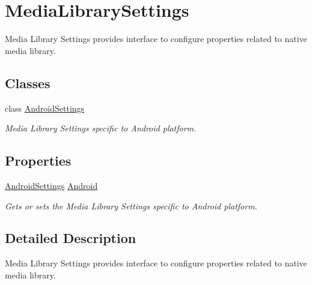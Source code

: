 \hypertarget{class_voxel_busters_1_1_native_plugins_1_1_media_library_settings}{}\section{Media\+Library\+Settings}
\label{class_voxel_busters_1_1_native_plugins_1_1_media_library_settings}


Media Library Settings provides interface to configure properties related to native media library.  


\subsection*{Classes}
\begin{DoxyCompactItemize}
\item 
class \hyperlink{class_voxel_busters_1_1_native_plugins_1_1_media_library_settings_1_1_android_settings}{Android\+Settings}
\begin{DoxyCompactList}\small\item\em Media Library Settings specific to Android platform. \end{DoxyCompactList}\end{DoxyCompactItemize}
\subsection*{Properties}
\begin{DoxyCompactItemize}
\item 
\hyperlink{class_voxel_busters_1_1_native_plugins_1_1_media_library_settings_1_1_android_settings}{Android\+Settings} \hyperlink{class_voxel_busters_1_1_native_plugins_1_1_media_library_settings_a1c2d6ed884eda0a6f3e7bb4913332b0a}{Android}
\begin{DoxyCompactList}\small\item\em Gets or sets the Media Library Settings specific to Android platform. \end{DoxyCompactList}\end{DoxyCompactItemize}


\subsection{Detailed Description}
Media Library Settings provides interface to configure properties related to native media library. 



